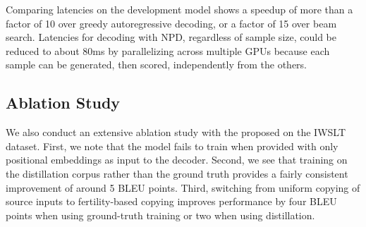 Comparing latencies on the development model shows a speedup of more than a factor of 10 over greedy autoregressive decoding, or a factor of 15 over beam search.  Latencies for decoding with NPD, regardless of sample size, could be reduced to about 80ms by parallelizing across multiple GPUs because each sample can be generated, then scored, independently from the others.

\subsection{Ablation Study}
We also conduct an extensive ablation study with the proposed \model{} on the IWSLT dataset. First, we note that the model fails to train when provided with only positional embeddings as input to the decoder. Second, we see that training on the distillation corpus rather than the ground truth provides a fairly consistent improvement of around 5 BLEU points. Third, switching from uniform copying of source inputs to fertility-based copying improves performance by four BLEU points when using ground-truth training or two when using distillation.



